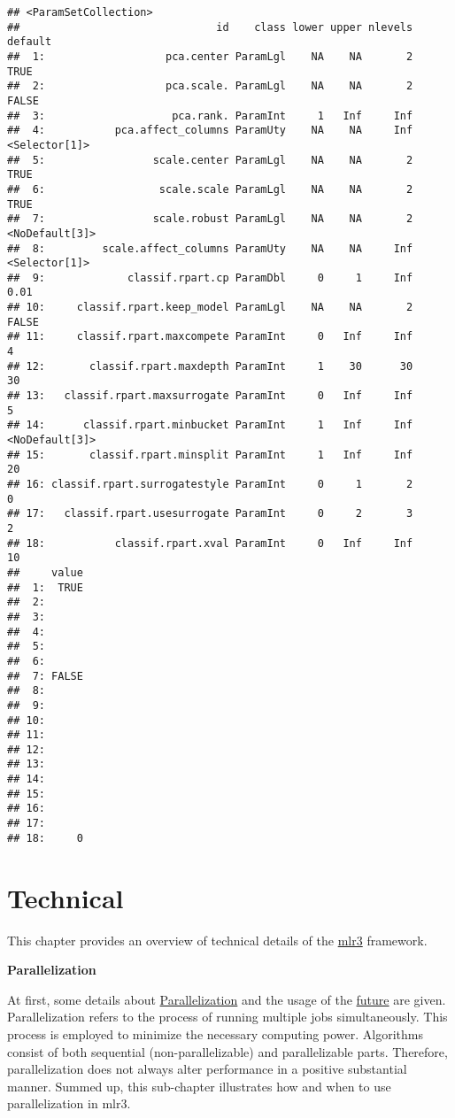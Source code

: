 \documentclass[
]{scrbook}
\begin{document}
\begin{verbatim}
## <ParamSetCollection>
##                               id    class lower upper nlevels        default
##  1:                   pca.center ParamLgl    NA    NA       2           TRUE
##  2:                   pca.scale. ParamLgl    NA    NA       2          FALSE
##  3:                    pca.rank. ParamInt     1   Inf     Inf               
##  4:           pca.affect_columns ParamUty    NA    NA     Inf  <Selector[1]>
##  5:                 scale.center ParamLgl    NA    NA       2           TRUE
##  6:                  scale.scale ParamLgl    NA    NA       2           TRUE
##  7:                 scale.robust ParamLgl    NA    NA       2 <NoDefault[3]>
##  8:         scale.affect_columns ParamUty    NA    NA     Inf  <Selector[1]>
##  9:             classif.rpart.cp ParamDbl     0     1     Inf           0.01
## 10:     classif.rpart.keep_model ParamLgl    NA    NA       2          FALSE
## 11:     classif.rpart.maxcompete ParamInt     0   Inf     Inf              4
## 12:       classif.rpart.maxdepth ParamInt     1    30      30             30
## 13:   classif.rpart.maxsurrogate ParamInt     0   Inf     Inf              5
## 14:      classif.rpart.minbucket ParamInt     1   Inf     Inf <NoDefault[3]>
## 15:       classif.rpart.minsplit ParamInt     1   Inf     Inf             20
## 16: classif.rpart.surrogatestyle ParamInt     0     1       2              0
## 17:   classif.rpart.usesurrogate ParamInt     0     2       3              2
## 18:           classif.rpart.xval ParamInt     0   Inf     Inf             10
##     value
##  1:  TRUE
##  2:      
##  3:      
##  4:      
##  5:      
##  6:      
##  7: FALSE
##  8:      
##  9:      
## 10:      
## 11:      
## 12:      
## 13:      
## 14:      
## 15:      
## 16:      
## 17:      
## 18:     0
\end{verbatim}

\hypertarget{technical}{%
\chapter{Technical}\label{technical}}

This chapter provides an overview of technical details of the \href{https://mlr3.mlr-org.com}{mlr3} framework.

\textbf{Parallelization}

At first, some details about \protect\hyperlink{parallelization}{Parallelization} and the usage of the \href{https://cran.r-project.org/package=future}{future} are given.
Parallelization refers to the process of running multiple jobs simultaneously.
This process is employed to minimize the necessary computing power.
Algorithms consist of both sequential (non-parallelizable) and parallelizable parts.
Therefore, parallelization does not always alter performance in a positive substantial manner.
Summed up, this sub-chapter illustrates how and when to use parallelization in mlr3.
\end{document}
